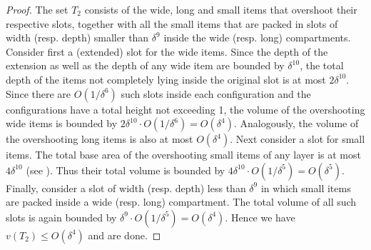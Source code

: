 \begin{proof}
The set $T_2$ consists of the wide, long and small items that overshoot their respective slots, together with all the small items that are packed in slots of width (resp. depth) smaller than $\delta^9$ inside the wide (resp. long) compartments. Consider first a (extended) slot for the wide items. Since the depth of the extension as well as the depth of any wide item are bounded by $\delta^{10}$, the total depth of the items not completely lying inside the original slot is at most $2\delta^{10}$. Since there are $O(1/\delta^6)$ such slots inside each configuration and the configurations have a total height not exceeding 1, the volume of the overshooting wide items is bounded by $2\delta^{10}\cdot O(1/\delta^6) = O(\delta^4)$. Analogously, the volume of the overshooting long items is also at most $O(\delta^4)$. Next consider a slot for small items. The total base area of the overshooting small items of any layer is at most $4\delta^{10}$ (see ). Thus their total volume is bounded by $4\delta^{10}\cdot O(1/\delta^5)=O(\delta^5)$. Finally, consider a slot of width (resp. depth) less than $\delta^9$ in which small items are packed inside a wide (resp. long) compartment. The total volume of all such slots is again bounded by $\delta^9\cdot O(1/\delta^5)=O(\delta^4)$. Hence we have $v(T_2)\le O(\delta^4)$ and are done.
\end{proof}

